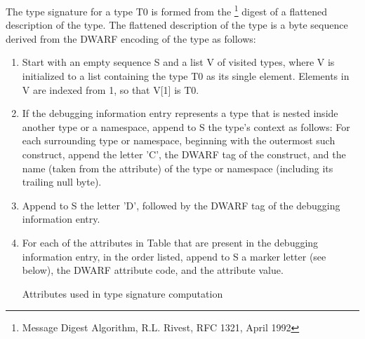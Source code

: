 The type signature for a type T0 is formed from the 
\MDfive{}\footnote{ Message Digest Algorithm, 
R.L. Rivest, RFC 1321, April 1992}
digest of a flattened description of the type. The flattened
description of the type is a byte sequence derived from the
DWARF encoding of the type as follows:
\begin{enumerate}[1. ]

\item Start with an empty sequence S and a list V of visited
types, where V is initialized to a list containing the type
T0 as its single element. Elements in V are indexed from 1,
so that V[1] is T0.

\item If the debugging information entry represents a type that
is nested inside another type or a namespace, append to S
the type\textquoteright s context as follows: For each surrounding type
or namespace, beginning with the outermost such construct,
append the letter 'C', the DWARF tag of the construct, and
the name (taken from 
the \DWATname{} attribute) of the type
or namespace (including its trailing null byte).

\item  Append to S the letter 'D', followed by the DWARF tag of
the debugging information entry.

\item For each of the attributes in
Table 
that are present in
the debugging information entry, in the order listed,
append to S a marker letter (see below), the DWARF attribute
code, and the attribute value.

\begin{table}[ht]
\caption{Attributes used in type signature computation}
\label{tab:attributesusedintypesignaturecomputation}
\simplerule[\textwidth]
\begin{center}
\end{center}
\simplerule[\textwidth]
\end{table}


\end{enumerate}
